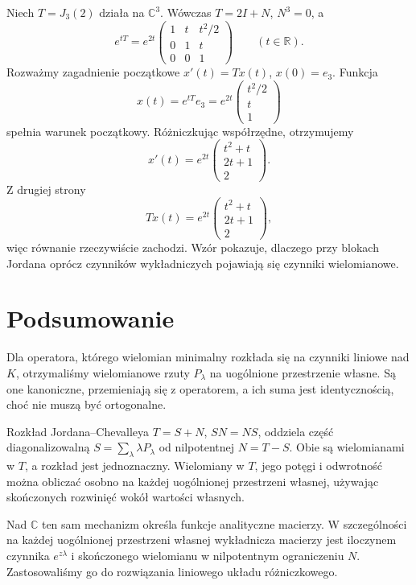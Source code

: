 \begin{przyklad}
\label{prz:lin18-ode}
Niech \(T=J_3(2)\) działa na \(\mathbb C^3\).
Wówczas
\(T=2I+N\), \(N^3=0\), a
\[
 e^{tT}
 =e^{2t}
 \begin{pmatrix}
 1&t&t^2/2\\
 0&1&t\\
 0&0&1
 \end{pmatrix}
 \qquad(t\in\mathbb R).
\]
Rozważmy zagadnienie początkowe
\(x'(t)=Tx(t)\), \(x(0)=e_3\).
Funkcja
\[
 x(t)=e^{tT}e_3
     =e^{2t}\begin{pmatrix}t^2/2\\t\\1\end{pmatrix}
\]
spełnia warunek początkowy.
Różniczkując współrzędne, otrzymujemy
\[
 x'(t)
 =e^{2t}
 \begin{pmatrix}t^2+t\\2t+1\\2\end{pmatrix}.
\]
Z drugiej strony
\[
 Tx(t)
 =e^{2t}
 \begin{pmatrix}t^2+t\\2t+1\\2\end{pmatrix},
\]
więc równanie rzeczywiście zachodzi.
Wzór pokazuje, dlaczego przy blokach Jordana
oprócz czynników wykładniczych
pojawiają się czynniki wielomianowe.
\end{przyklad}

\section{Podsumowanie}
\label{sec:lin18-summary}

Dla operatora, którego wielomian minimalny
rozkłada się na czynniki liniowe nad \(K\),
otrzymaliśmy wielomianowe rzuty
\(P_\lambda\) na uogólnione przestrzenie własne.
Są one kanoniczne, przemieniają się z operatorem,
a ich suma jest identycznością, choć nie muszą
być ortogonalne.

Rozkład Jordana--Chevalleya
\(T=S+N\), \(SN=NS\), oddziela
część diagonalizowalną
\(S=\sum_\lambda\lambda P_\lambda\)
od nilpotentnej \(N=T-S\).
Obie są wielomianami w \(T\),
a rozkład jest jednoznaczny.
Wielomiany w \(T\), jego potęgi
i odwrotność można obliczać osobno
na każdej uogólnionej przestrzeni własnej,
używając skończonych rozwinięć wokół
wartości własnych.

Nad \(\mathbb C\) ten sam mechanizm
określa funkcje analityczne macierzy.
W szczególności na każdej uogólnionej
przestrzeni własnej wykładnicza macierzy
jest iloczynem czynnika \(e^{z\lambda}\)
i skończonego wielomianu
w nilpotentnym ograniczeniu \(N\).
Zastosowaliśmy go do rozwiązania
liniowego układu różniczkowego.
